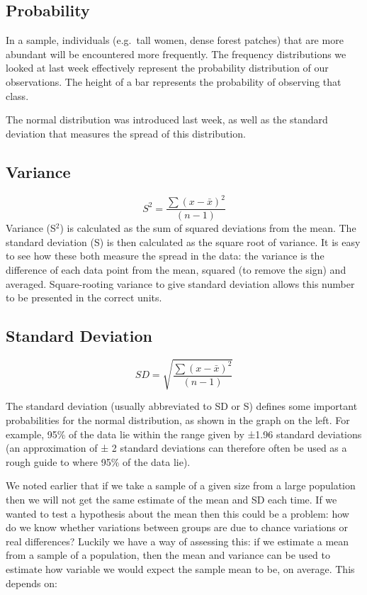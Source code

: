 \documentclass[
]{book}
\begin{document}
\hypertarget{probability}{%
\subsection*{Probability}\label{probability}}

In a sample, individuals (e.g.~tall women, dense forest patches) that are more abundant will be encountered more frequently. The frequency distributions we looked at last week effectively represent the probability distribution of our observations. The height of a bar represents the probability of observing that class.

The normal distribution was introduced last week, as well as the standard deviation that measures the spread of this distribution.

\hypertarget{variance}{%
\subsection*{Variance}\label{variance}}

\[
S^2 = \frac{\sum (x - \bar x)^2}{(n-1)}
\]
Variance (S\(^2\)) is calculated as the sum of squared deviations from the mean. The standard deviation (S) is then calculated as the square root of variance. It is easy to see how these both measure the spread in the data: the variance is the difference of each data point from the mean, squared (to remove the sign) and averaged. Square-rooting variance to give standard deviation allows this number to be presented in the correct units.

\hypertarget{standard-deviation}{%
\subsection*{Standard Deviation}\label{standard-deviation}}

\[
SD= \sqrt{\frac{\sum (x - \bar x)^2}{(n-1)}} 
\]

The standard deviation (usually abbreviated to SD or S) defines some important probabilities for the normal distribution, as shown in the graph on the left. For example, 95\% of the data lie within the range given by ±1.96 standard deviations (an approximation of ± 2 standard deviations can therefore often be used as a rough guide to where 95\% of the data lie).

We noted earlier that if we take a sample of a given size from a large population then we will not get the same estimate of the mean and SD each time. If we wanted to test a hypothesis about the mean then this could be a problem: how do we know whether variations between groups are due to chance variations or real differences? Luckily we have a way of assessing this: if we estimate a mean from a sample of a population, then the mean and variance can be used to estimate how variable we would expect the sample mean to be, on average. This depends on:
\end{document}
